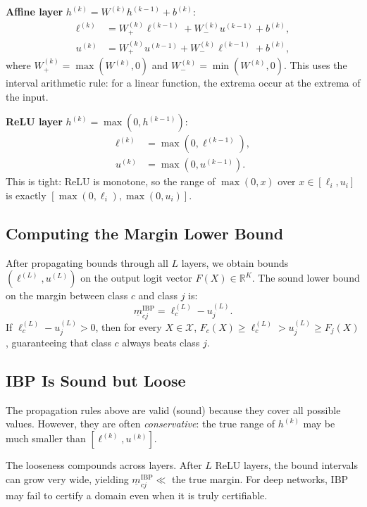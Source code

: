 \documentclass[11pt, a4paper]{article}
\theoremstyle{definition}
\theoremstyle{plain}
\newcommand{\R}{\mathbb{R}}
\newcommand{\mbm}[1]{\underline{m}_{#1}}
\begin{document}
\textbf{Affine layer} $h^{(k)} = W^{(k)} h^{(k-1)} + b^{(k)}$:
\begin{align}
  \ell^{(k)} &= W^{(k)}_+ \ell^{(k-1)} + W^{(k)}_- u^{(k-1)} + b^{(k)}, \\
  u^{(k)}    &= W^{(k)}_+ u^{(k-1)} + W^{(k)}_- \ell^{(k-1)} + b^{(k)},
\end{align}
where $W^{(k)}_+ = \max(W^{(k)}, 0)$ and $W^{(k)}_- = \min(W^{(k)}, 0)$.
This uses the interval arithmetic rule: for a linear function, the extrema
occur at the extrema of the input.

\textbf{ReLU layer} $h^{(k)} = \max(0, h^{(k-1)})$:
\begin{align}
  \ell^{(k)} &= \max(0, \ell^{(k-1)}), \\
  u^{(k)}    &= \max(0, u^{(k-1)}).
\end{align}
This is tight: ReLU is monotone, so the range of $\max(0, x)$ over
$x \in [\ell_i, u_i]$ is exactly $[\max(0, \ell_i), \max(0, u_i)]$.

\subsection{Computing the Margin Lower Bound}

After propagating bounds through all $L$ layers, we obtain bounds
$(\ell^{(L)}, u^{(L)})$ on the output logit vector $F(X) \in \R^K$.
The sound lower bound on the margin between class $c$ and class $j$ is:
\begin{equation}
  \mbm{cj}^{\text{IBP}} = \ell^{(L)}_c - u^{(L)}_j.
\end{equation}
If $\ell^{(L)}_c - u^{(L)}_j > 0$, then for every $X \in \mathcal{X}$,
$F_c(X) \ge \ell^{(L)}_c > u^{(L)}_j \ge F_j(X)$, guaranteeing that class $c$
always beats class $j$.

\subsection{IBP Is Sound but Loose}

The propagation rules above are valid (sound) because they cover all possible
values. However, they are often \emph{conservative}: the true range of $h^{(k)}$
may be much smaller than $[\ell^{(k)}, u^{(k)}]$.

The looseness compounds across layers. After $L$ ReLU layers, the bound intervals
can grow very wide, yielding $\mbm{cj}^{\text{IBP}} \ll$ the true margin.
For deep networks, IBP may fail to certify a domain even when it is truly certifiable.
\end{document}

